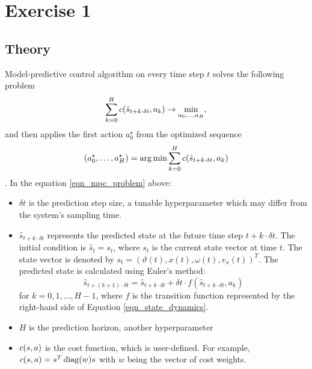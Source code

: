 \documentclass[12pt]{article}
\begin{document}
\section*{Exercise 1}
\subsection*{Theory}
Model-predictive control algorithm on every time step $t$ solves the following problem
\begin{equation}
    \label{eqn_mpc_problem}
    \sum_{k = 0}^H c(\hat{s}_{t+k\cdot \delta t}, a_k) \rightarrow \min_{a_0, \dots, a_H}, 
\end{equation}
and then applies the first action $a_0^{\star}$ from the optimized sequence 
$$
    (a_0^{\star}, \dots, a_H^{\star}) = \arg\min \sum_{k = 0}^H c(\hat{s}_{t+k\cdot \delta t}, a_k)
$$. 
In the equation \eqref{eqn_mpc_problem} above:
\begin{itemize}
    \item $\delta t$ is the prediction step size, a tunable hyperparameter which may differ from the system's sampling time.
    \item $\hat{s}_{t+k\cdot \delta t}$ represents the predicted state at the future time step $t+k \cdot \delta t$. 
    The initial condition is $\hat{s}_{t} = s_t$, where $s_t$ is the current state vector at time $t$. 
    The state vector is denoted by $s_t = (\vartheta(t), x(t), \omega(t), v_x(t))^T$.
    The predicted state is calculated using Euler's method: 
    $$
    \hat{s}_{t+(k + 1)\cdot \delta t} = \hat{s}_{t+k\cdot \delta t} + \delta t \cdot f(\hat{s}_{t+k\cdot \delta t}, a_k)
    $$
    for $k = 0, 1, \ldots, H-1$, where $f$ is the transition function represented by the right-hand side of Equation \ref{eqn_state_dynamics}.
    \item $H$  is the prediction horizon, another hyperparameter
    \item $c(s, a)$ is the cost function, which is user-defined. 
    For example, $c(s, a) = s^T \operatorname*{diag}(w) s$ with $w$ being the vector of cost weights.
\end{itemize}
\end{document}

